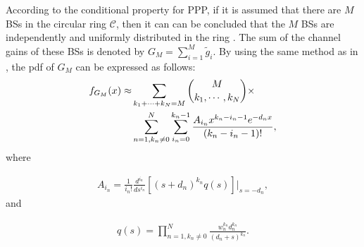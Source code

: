 \documentclass[10pt, doublecolumn]{IEEEtran}
\newcommand{\Equ}[1]{
  \begin{align}
    #1
  \end{align}}
\begin{document}
According to the conditional property for PPP, if it is assumed that there are $M$ BSs in the circular ring $\mathcal{C}$, then it can can be concluded that the $M$ BSs are independently and uniformly distributed in the ring \cite{haenggi2012stochastic}. The sum of the channel gains of these BSs is denoted by
$G_M=\sum_{i=1}^M\tilde{g}_i$. By using the same method as in \cite{ding2018coexistence}, the  pdf of $G_M$ can be expressed as follows:
\begin{align}\label{G_M_pdf}
  f_{G_M}(x)\approx&\sum_{\substack{k_1+\cdots+k_N=M}}{M \choose k_1, \cdots, k_N}
  \times\\\notag
  &\sum\limits_{n=1,k_n\neq0}^{N}\sum\limits_{i_n=0}^{k_n-1}\frac{
  A_{i_n}x^{k_n-i_n-1}e^{-d_nx}}{(k_n-i_n-1)!},
\end{align}
where
\Equ{A_{i_n}=\frac{1}{i_n!}\frac{d^{i_n}}{ds^{i_n}}\left[ (s+d_n)^{k_n}q(s) \right] |_{s=-d_n},}
and
\Equ{
  q(s)=\prod_{n=1,k_n\neq0}^{N}\frac{w_n^{k_n}d_n^{k_n}}{(d_n+s)^{k_n}}.}
\end{document}
